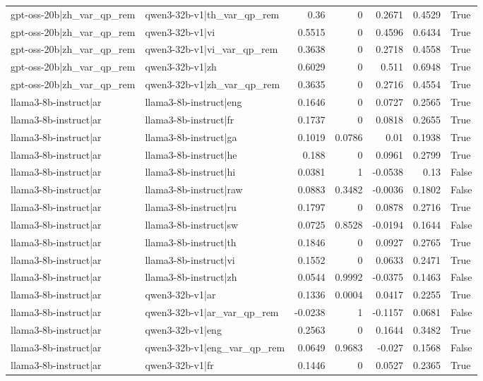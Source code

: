 \begin{table}
\begin{tabular}{l l r r r r l}
gpt-oss-20b|zh_var_qp_rem & qwen3-32b-v1|th_var_qp_rem & 0.36 & 0 & 0.2671 & 0.4529 & True \\
gpt-oss-20b|zh_var_qp_rem & qwen3-32b-v1|vi & 0.5515 & 0 & 0.4596 & 0.6434 & True \\
gpt-oss-20b|zh_var_qp_rem & qwen3-32b-v1|vi_var_qp_rem & 0.3638 & 0 & 0.2718 & 0.4558 & True \\
gpt-oss-20b|zh_var_qp_rem & qwen3-32b-v1|zh & 0.6029 & 0 & 0.511 & 0.6948 & True \\
gpt-oss-20b|zh_var_qp_rem & qwen3-32b-v1|zh_var_qp_rem & 0.3635 & 0 & 0.2716 & 0.4554 & True \\
llama3-8b-instruct|ar & llama3-8b-instruct|eng & 0.1646 & 0 & 0.0727 & 0.2565 & True \\
llama3-8b-instruct|ar & llama3-8b-instruct|fr & 0.1737 & 0 & 0.0818 & 0.2655 & True \\
llama3-8b-instruct|ar & llama3-8b-instruct|ga & 0.1019 & 0.0786 & 0.01 & 0.1938 & True \\
llama3-8b-instruct|ar & llama3-8b-instruct|he & 0.188 & 0 & 0.0961 & 0.2799 & True \\
llama3-8b-instruct|ar & llama3-8b-instruct|hi & 0.0381 & 1 & -0.0538 & 0.13 & False \\
llama3-8b-instruct|ar & llama3-8b-instruct|raw & 0.0883 & 0.3482 & -0.0036 & 0.1802 & False \\
llama3-8b-instruct|ar & llama3-8b-instruct|ru & 0.1797 & 0 & 0.0878 & 0.2716 & True \\
llama3-8b-instruct|ar & llama3-8b-instruct|sw & 0.0725 & 0.8528 & -0.0194 & 0.1644 & False \\
llama3-8b-instruct|ar & llama3-8b-instruct|th & 0.1846 & 0 & 0.0927 & 0.2765 & True \\
llama3-8b-instruct|ar & llama3-8b-instruct|vi & 0.1552 & 0 & 0.0633 & 0.2471 & True \\
llama3-8b-instruct|ar & llama3-8b-instruct|zh & 0.0544 & 0.9992 & -0.0375 & 0.1463 & False \\
llama3-8b-instruct|ar & qwen3-32b-v1|ar & 0.1336 & 0.0004 & 0.0417 & 0.2255 & True \\
llama3-8b-instruct|ar & qwen3-32b-v1|ar_var_qp_rem & -0.0238 & 1 & -0.1157 & 0.0681 & False \\
llama3-8b-instruct|ar & qwen3-32b-v1|eng & 0.2563 & 0 & 0.1644 & 0.3482 & True \\
llama3-8b-instruct|ar & qwen3-32b-v1|eng_var_qp_rem & 0.0649 & 0.9683 & -0.027 & 0.1568 & False \\
llama3-8b-instruct|ar & qwen3-32b-v1|fr & 0.1446 & 0 & 0.0527 & 0.2365 & True \\

\end{tabular}
\end{table}
